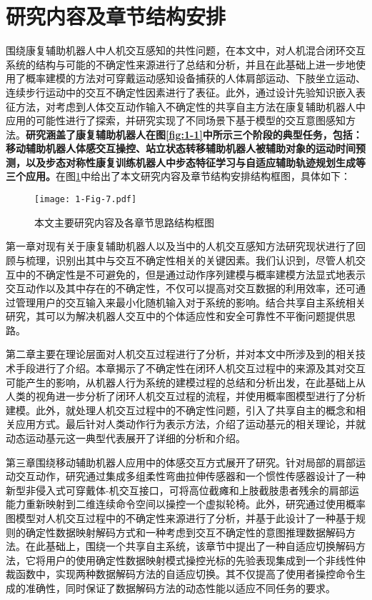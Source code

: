 \section{研究内容及章节结构安排}
围绕康复辅助机器人中人机交互感知的共性问题，在本文中，对人机混合闭环交互系统的结构与可能的不确定性来源进行了总结和分析，并且在此基础上进一步地使用了概率建模的方法对可穿戴运动感知设备捕获的人体肩部运动、下肢坐立运动、连续步行运动中的交互不确定性因素进行了表征。此外，通过设计先验知识嵌入表征方法，对考虑到人体交互动作输入不确定性的共享自主方法在康复辅助机器人中应用的可能性进行了探索，并研究实现了不同场景下基于模型的交互意图感知方法。\textbf{研究涵盖了康复辅助机器人在图\ref{fig:1-1}中所示三个阶段的典型任务，包括：移动辅助机器人体感交互操控、站立状态转移辅助机器人被辅助对象的运动时间预测，以及步态对称性康复训练机器人中步态特征学习与自适应辅助轨迹规划生成等三个应用。}在图\ref{fig:1-7}中给出了本文研究内容及章节结构安排结构框图，具体如下：

\begin{figure}[htb]
  \centering
  \texttt{[image: 1-Fig-7.pdf]}
  \caption{本文主要研究内容及各章节思路结构框图}
  \label{fig:1-7}
\end{figure}

第一章对现有关于康复辅助机器人以及当中的人机交互感知方法研究现状进行了回顾与梳理，识别出其中与交互不确定性相关的关键因素。我们认识到，尽管人机交互中的不确定性是不可避免的，但是通过动作序列建模与概率建模方法显式地表示交互动作以及其中存在的不确定性，不仅可以提高对交互数据的利用效率，还可通过管理用户的交互输入来最小化随机输入对于系统的影响。结合共享自主系统相关研究，其可以为解决机器人交互中的个体适应性和安全可靠性不平衡问题提供思路。

第二章主要在理论层面对人机交互过程进行了分析，并对本文中所涉及到的相关技术手段进行了介绍。本章揭示了不确定性在闭环人机交互过程中的来源及其对交互可能产生的影响，从机器人行为系统的建模过程的总结和分析出发，在此基础上从人类的视角进一步分析了闭环人机交互过程的流程，并使用概率图模型进行了分析建模。此外，就处理人机交互过程中的不确定性问题，引入了共享自主的概念和相关应用方式。最后针对人类动作行为表示方法，介绍了运动基元的相关理论，并就动态运动基元这一典型代表展开了详细的分析和介绍。

第三章围绕移动辅助机器人应用中的体感交互方式展开了研究。针对局部的肩部运动交互动作，研究通过集成多组柔性弯曲拉伸传感器和一个惯性传感器设计了一种新型非侵入式可穿戴体-机交互接口，可将高位截瘫和上肢截肢患者残余的肩部运能力重新映射到二维连续命令空间以操控一个虚拟轮椅。此外，研究通过使用概率图模型对人机交互过程中的不确定性来源进行了分析，并基于此设计了一种基于规则的确定性数据映射解码方式和一种考虑到交互不确定性的意图推理数据解码方法。在此基础上，围绕一个共享自主系统，该章节中提出了一种自适应切换解码方法，它将用户的使用确定性数据映射模式操控光标的先验表现集成到一个非线性仲裁函数中，实现两种数据解码方法的自适应切换。其不仅提高了使用者操控命令生成的准确性，同时保证了数据解码方法的动态性能以适应不同任务的要求。

